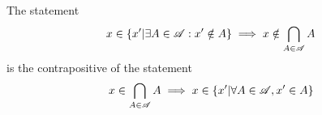\documentclass[main.tex]{subfiles}
\begin{document}
\subproblem{}\label{6g}

\begin{remark}
	The statement
	\[x \in \{x'|\exists A \in \mathscr{A} : x' \notin A\} \implies x \notin \bigcap\limits_{A \in \mathscr{A}} {A}\]
	is the contrapositive of the statement
	\[x \in \bigcap\limits_{A \in \mathscr{A}} {A} \implies x \in \{x'|\forall A \in \mathscr{A}, x' \in A\}\]
\end{remark}
\end{document}
